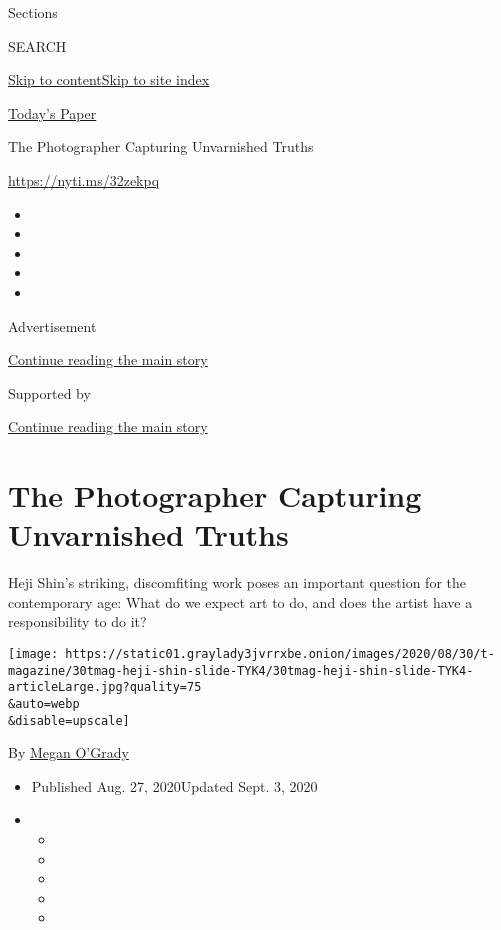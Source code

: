 Sections

SEARCH

\protect\hyperlink{site-content}{Skip to
content}\protect\hyperlink{site-index}{Skip to site index}

\href{https://myaccount.nytimes3xbfgragh.onion/auth/login?response_type=cookie\&client_id=vi}{}

\href{https://www.nytimes3xbfgragh.onion/section/todayspaper}{Today's
Paper}

The Photographer Capturing Unvarnished Truths

\url{https://nyti.ms/32zekpq}

\begin{itemize}
\item
\item
\item
\item
\item
\end{itemize}

Advertisement

\protect\hyperlink{after-top}{Continue reading the main story}

Supported by

\protect\hyperlink{after-sponsor}{Continue reading the main story}

\hypertarget{the-photographer-capturing-unvarnished-truths}{%
\section{The Photographer Capturing Unvarnished
Truths}\label{the-photographer-capturing-unvarnished-truths}}

Heji Shin's striking, discomfiting work poses an important question for
the contemporary age: What do we expect art to do, and does the artist
have a responsibility to do it?

\texttt{[image: https://static01.graylady3jvrrxbe.onion/images/2020/08/30/t-magazine/30tmag-heji-shin-slide-TYK4/30tmag-heji-shin-slide-TYK4-articleLarge.jpg?quality=75\\\&auto=webp\\\&disable=upscale]}

By \href{https://www.nytimes3xbfgragh.onion/by/megan-o-grady}{Megan
O'Grady}

\begin{itemize}
\item
  Published Aug. 27, 2020Updated Sept. 3, 2020
\item
  \begin{itemize}
  \item
  \item
  \item
  \item
  \item
  \end{itemize}
\end{itemize}

